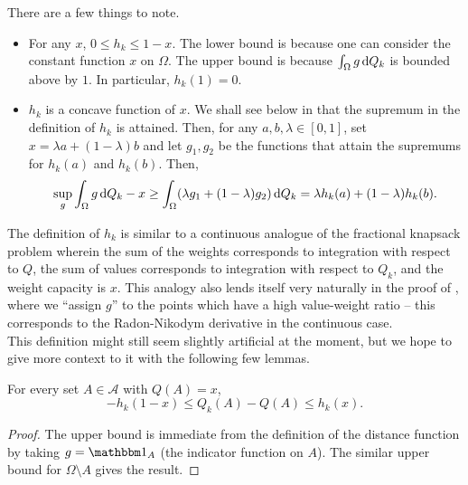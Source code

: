 There are a few things to note.
\begin{itemize}
	\item For any $x$, $0\leq h_k\leq 1-x$. The lower bound is because one can consider the constant function $x$ on $\Omega$. The upper bound is because $\int_\Omega g\operatorname{d}\!{Q}_k$ is bounded above by $1$. In particular, $h_k(1)=0$.
	\item $h_k$ is a concave function of $x$. We shall see below in  that the supremum in the definition of $h_k$ is attained. Then, for any $a,b,\lambda\in[0,1]$, set $x=\lambda a+(1-\lambda)b$ and let $g_1,g_2$ be the functions that attain the supremums for $h_k(a)$ and $h_k(b)$. Then,
	\[ \sup_g \int_\Omega g\operatorname{d}\!{Q}_k - x \geq \int_\Omega (\lambda g_1 + (1-\lambda)g_2) \operatorname{d}\!{Q}_k = \lambda h_k(a) + (1-\lambda) h_k(b). \]
\end{itemize}

The definition of $h_k$ is similar to a continuous analogue of the fractional knapsack problem wherein the sum of the weights corresponds to integration with respect to $Q$, the sum of values corresponds to integration with respect to $Q_k$, and the weight capacity is $x$. This analogy also lends itself very naturally in the proof of , where we ``assign $g$'' to the points which have a high value-weight ratio -- this corresponds to the Radon-Nikodym derivative in the continuous case.\\
This definition might still seem slightly artificial at the moment, but we hope to give more context to it with the following few lemmas.

\begin{lemma}
	For every set $A\in\mathcal{A}$ with $Q(A)=x$,
	\[ -h_k(1-x) \leq Q_k(A) - Q(A) \leq h_k(x). \]
\end{lemma}
\begin{proof}
	The upper bound is immediate from the definition of the distance function by taking $g = \indic_A$ (the indicator function on $A$). The similar upper bound for $\Omega\setminus A$ gives the result.
\end{proof}

